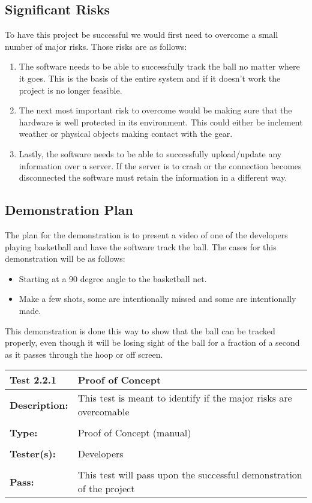 \documentclass{article}
\begin{document}
\subsection{Significant Risks}
To have this project be successful we would first need to overcome a small number of major risks. Those risks are as follows:
\begin{enumerate}
    \item The software needs to be able to successfully track the ball no matter where it goes. This is the basis of the entire system and if it doesn't work the project is no longer feasible.
    \item The next most important risk to overcome would be making sure that the hardware is well protected in its environment. This could either be inclement weather or physical objects making contact with the gear.
    \item Lastly, the software needs to be able to successfully upload/update any information over a server. If the server is to crash or the connection becomes disconnected the software must retain the information in a different way.
\end{enumerate}

\newpage
\subsection{Demonstration Plan}
The plan for the demonstration is to present a video of one of the developers playing basketball and have the software track the ball. The cases for this demonstration will be as follows:
\begin{itemize}
    \item Starting at a 90 degree angle to the basketball net.
    \item Make a few shots, some are intentionally missed and some are intentionally made.
\end{itemize}


This demonstration is done this way to show that the ball can be tracked properly, even though it will be losing sight of the ball for a fraction of a second as it passes through the hoop or off screen.


\begin{tabularx}{\textwidth}{p{2cm}p{9cm}}
\toprule 
{\bf Test 2.2.1} & {\bf Proof of Concept}\\
\midrule
\textbf{Description:} & This test is meant to identify if the major risks are overcomable \\[0.3\baselineskip]
                      &                     \\
\textbf{Type:} & Proof of Concept (manual)   \\[0.3\baselineskip]
                      &                     \\
\textbf{Tester(s):} & Developers \\[0.3\baselineskip]
                      &                     \\
\textbf{Pass:} & This test will pass upon the successful demonstration of the project \\[0.3\baselineskip]
\bottomrule
\end{tabularx}
\end{document}
